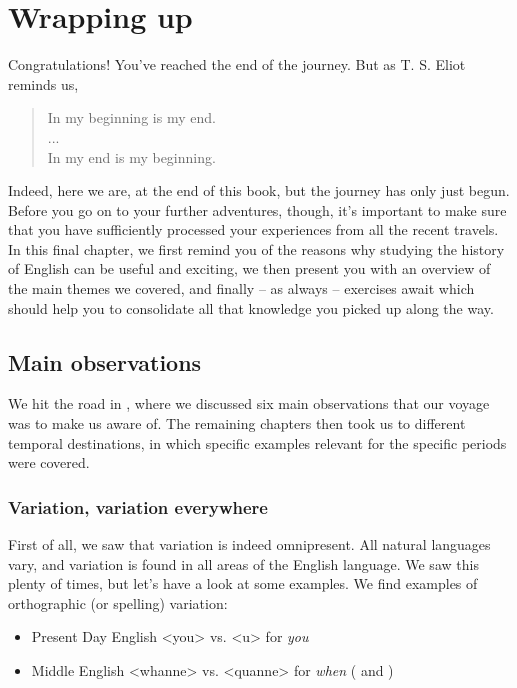 \chapter{Wrapping up}

Congratulations! You've reached the end of the journey. But as T. S. Eliot reminds us,

\begin{quote}
    In my beginning is my end.\\
    ...\\
    In my end is my beginning.\\
    \citep[177, 183]{Eliot}
\end{quote}

\noindent Indeed, here we are, at the end of this book, but the journey has only just begun. Before you go on to your further adventures, though, it's important to make sure that you have sufficiently processed your experiences from all the recent travels. In this final chapter, we first remind you of the reasons why studying the history of English can be useful and exciting, we then present you with an overview of the main themes we covered, and finally -- as always -- exercises await which should help you to consolidate all that knowledge you picked up along the way.

\section{Main observations}\label{reasons}
We hit the road in , where we discussed six main observations that our voyage was to make us aware of. The remaining chapters then took us to different temporal destinations, in which specific examples relevant for the specific periods were covered.

\subsection{Variation, variation everywhere}
First of all, we saw that variation is indeed omnipresent. All natural languages vary, and variation is found in all areas of the English language. We saw this plenty of times, but let's have a look at some examples. We find examples of orthographic (or spelling) variation:
\begin{itemize}
    \item Present Day English <you> vs. <u> for \textit{you}
    \item Middle English <whanne> vs. <quanne> for \textit{when} ( and )
\end{itemize}

